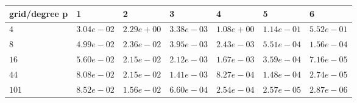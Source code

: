 \begin{tabular}{lllllll}
\hline
 grid/degree p   & 1          & 2          & 3          & 4          & 5          & 6          \\
\hline
 $4$             & $3.04e-02$ & $2.29e+00$ & $3.38e-03$ & $1.08e+00$ & $1.14e-01$ & $5.52e-01$ \\
 $8$             & $4.99e-02$ & $2.36e-02$ & $3.95e-03$ & $2.43e-03$ & $5.51e-04$ & $1.56e-04$ \\
 $16$            & $5.60e-02$ & $2.15e-02$ & $2.12e-03$ & $1.67e-03$ & $3.59e-04$ & $7.16e-05$ \\
 $44$            & $8.08e-02$ & $2.15e-02$ & $1.41e-03$ & $8.27e-04$ & $1.48e-04$ & $2.74e-05$ \\
 $101$           & $8.52e-02$ & $1.56e-02$ & $6.60e-04$ & $2.54e-04$ & $2.57e-05$ & $2.87e-06$ \\
\hline
\end{tabular}